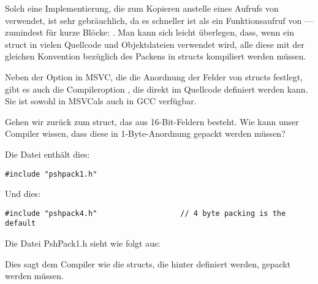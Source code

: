 Solch eine Implementierung, die zum Kopieren \MOV anstelle eines Aufrufs von  verwendet, ist sehr
gebräuchlich, da es schneller ist als ein Funktionsaufruf von ---zumindest für kurze Blöcke:
.
Man kann sich leicht überlegen, dass, wenn ein struct in vielen Quellcode und Objektdateien verwendet wird, alle diese
mit der gleichen Konvention bezüglich des Packens in structs kompiliert werden müssen.

Neben der Option  in MSVC, die die Anordnung der Felder von structs festlegt, gibt es auch die
Compileroption , die direkt im Quellcode definiert werden kann.
Sie ist sowohl in MSVC\FNURLMSDNZP als auch in GCC\FNURLGCCPC{} verfügbar.

Gehen wir zurück zum  struct, das aus 16-Bit-Feldern besteht.
Wie kann unser Compiler wissen, dass diese in 1-Byte-Anordnung gepackt werden müssen?

Die Datei  enthält dies:

\begin{lstlisting}[caption=WinNT.h,style=customc]
#include "pshpack1.h"
\end{lstlisting}

Und dies:

\begin{lstlisting}[caption=WinNT.h,style=customc]
#include "pshpack4.h"                   // 4 byte packing is the default
\end{lstlisting}

Die Datei PshPack1.h sieht wie folgt aus:



Dies sagt dem Compiler wie die structs, die hinter  definiert werden, gepackt werden müssen.


